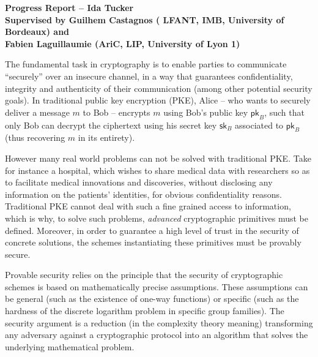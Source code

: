 \documentclass[10pt]{llncs}
\begin{document}
\begin{center}
	\textbf{\Large{Progress Report -- Ida Tucker}}\\
		\vspace{3mm}
	\textbf{Supervised by Guilhem Castagnos ( LFANT, IMB, University of Bordeaux) and \\
	Fabien Laguillaumie (AriC, LIP, University of Lyon 1)}\\
\end{center}

\vspace{3mm}


 The fundamental task in cryptography is to enable parties to communicate ``securely'' over an insecure channel, in a way that guarantees confidentiality, integrity and authenticity of their communication (among other potential security goals). 
%
In traditional public key encryption (PKE), Alice -- who wants to securely deliver a message $m$ to Bob -- encrypts $m$ using Bob's public key $\mathsf{pk}_{B}$, such that only Bob can decrypt the ciphertext using his secret key $\mathsf{sk}_{B}$ associated to $\mathsf{pk}_{B}$ (thus recovering $m$ in its entirety).

However many real world problems can not be solved with traditional PKE. Take for instance a hospital, which wishes to share medical data with researchers so as to facilitate medical innovations and discoveries, without disclosing any information on the patients' identities, for obvious confidentiality reasons.
Traditional PKE cannot deal with such a fine grained access to information, which is why, to solve such problems, \emph{advanced} cryptographic primitives must be defined. Moreover, in order to guarantee a high level of trust in the security of concrete solutions, the schemes instantiating these primitives must be provably secure.

Provable security \cite{GolMic84} relies on the principle that the security of cryptographic schemes is based on mathematically precise assumptions. These assumptions can be general (such as the existence of one-way functions) or specific (such as the hardness of the discrete logarithm problem in specific group families). The security argument is a reduction (in the complexity theory meaning) transforming any adversary against a cryptographic protocol into an algorithm that solves the underlying mathematical problem.
\end{document}
